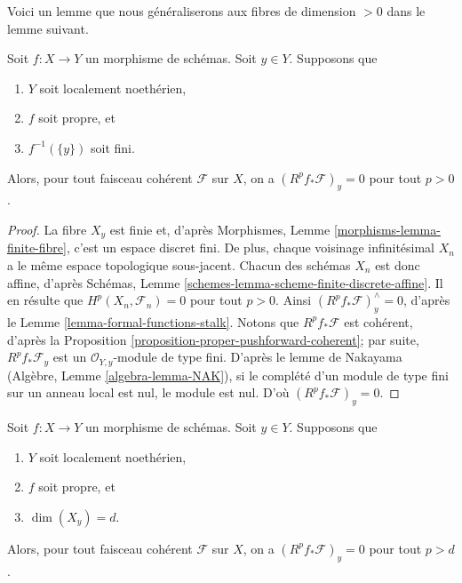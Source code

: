 \noindent
Voici un lemme que nous généraliserons aux fibres de
dimension $ > 0$ dans le lemme suivant.

\begin{lemma}
\label{lemma-higher-direct-images-zero-finite-fibre}
Soit $f : X \to Y$ un morphisme de schémas.
Soit $y \in Y$.
Supposons que
\begin{enumerate}
\item $Y$ soit localement noethérien,
\item $f$ soit propre, et
\item $f^{-1}(\{y\})$ soit fini.
\end{enumerate}
Alors, pour tout faisceau cohérent $\mathcal{F}$ sur $X$, on a
$(R^pf_*\mathcal{F})_y = 0$ pour tout $p > 0$.
\end{lemma}

\begin{proof}
La fibre $X_y$ est finie et, d'après
Morphismes, Lemme \ref{morphisms-lemma-finite-fibre},
c'est un espace discret fini. De plus, chaque voisinage infinitésimal
$X_n$ a le même espace topologique sous-jacent.
Chacun des schémas $X_n$ est donc affine, d'après
Schémas, Lemme \ref{schemes-lemma-scheme-finite-discrete-affine}.
Il en résulte que $H^p(X_n, \mathcal{F}_n) = 0$ pour tout
$p > 0$. Ainsi $(R^pf_*\mathcal{F})_y^\wedge = 0$,
d'après le Lemme \ref{lemma-formal-functions-stalk}.
Notons que $R^pf_*\mathcal{F}$ est cohérent, d'après la
Proposition \ref{proposition-proper-pushforward-coherent};
par suite, $R^pf_*\mathcal{F}_y$ est un
$\mathcal{O}_{Y, y}$-module de type fini. D'après le lemme de Nakayama
(Algèbre, Lemme \ref{algebra-lemma-NAK}),
si le complété d'un module de type fini sur un anneau local
est nul, le module est nul. D'où
$(R^pf_*\mathcal{F})_y = 0$.
\end{proof}

\begin{lemma}
\label{lemma-higher-direct-images-zero-above-dimension-fibre}
Soit $f : X \to Y$ un morphisme de schémas.
Soit $y \in Y$.
Supposons que
\begin{enumerate}
\item $Y$ soit localement noethérien,
\item $f$ soit propre, et
\item $\dim(X_y) = d$.
\end{enumerate}
Alors, pour tout faisceau cohérent $\mathcal{F}$ sur $X$, on a
$(R^pf_*\mathcal{F})_y = 0$ pour tout $p > d$.
\end{lemma}

